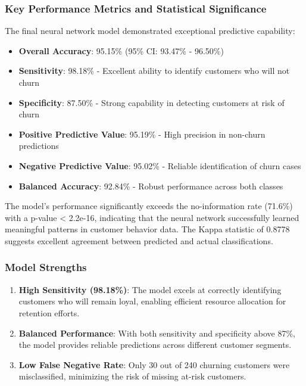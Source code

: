 \documentclass[
]{article}
\providecommand{\tightlist}{%
  \setlength{\itemsep}{0pt}\setlength{\parskip}{0pt}}
\begin{document}
\hypertarget{key-performance-metrics-and-statistical-significance}{%
\subsubsection{Key Performance Metrics and Statistical
Significance}\label{key-performance-metrics-and-statistical-significance}}

The final neural network model demonstrated exceptional predictive
capability:

\begin{itemize}
\tightlist
\item
  \textbf{Overall Accuracy}: 95.15\% (95\% CI: 93.47\% - 96.50\%)
\item
  \textbf{Sensitivity}: 98.18\% - Excellent ability to identify
  customers who will not churn
\item
  \textbf{Specificity}: 87.50\% - Strong capability in detecting
  customers at risk of churn
\item
  \textbf{Positive Predictive Value}: 95.19\% - High precision in
  non-churn predictions
\item
  \textbf{Negative Predictive Value}: 95.02\% - Reliable identification
  of churn cases
\item
  \textbf{Balanced Accuracy}: 92.84\% - Robust performance across both
  classes
\end{itemize}

The model's performance significantly exceeds the no-information rate
(71.6\%) with a p-value \textless{} 2.2e-16, indicating that the neural
network successfully learned meaningful patterns in customer behavior
data. The Kappa statistic of 0.8778 suggests excellent agreement between
predicted and actual classifications.

\hypertarget{model-strengths}{%
\subsubsection{Model Strengths}\label{model-strengths}}

\begin{enumerate}
\def\labelenumi{\arabic{enumi}.}
\item
  \textbf{High Sensitivity (98.18\%)}: The model excels at correctly
  identifying customers who will remain loyal, enabling efficient
  resource allocation for retention efforts.
\item
  \textbf{Balanced Performance}: With both sensitivity and specificity
  above 87\%, the model provides reliable predictions across different
  customer segments.
\item
  \textbf{Low False Negative Rate}: Only 30 out of 240 churning
  customers were misclassified, minimizing the risk of missing at-risk
  customers.
\end{enumerate}
\end{document}
